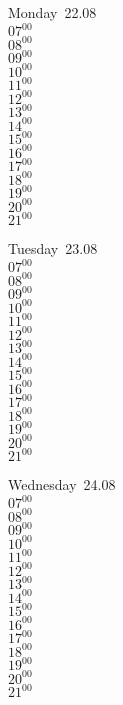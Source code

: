 \documentclass[11pt,a4paper]{book}\usepackage[]{graphicx}\usepackage[]{color}
\begin{document}
\begin{headerbox}
\end{headerbox}
\begin{weekdaybox}
  Monday~22.08\\
  { 
  \vfill
  $07^{00}$\\
$08^{00}$\\
$09^{00}$\\
$10^{00}$\\
$11^{00}$\\
$12^{00}$\\
$13^{00}$\\
$14^{00}$\\
$15^{00}$\\
$16^{00}$\\
$17^{00}$\\
$18^{00}$\\
$19^{00}$\\
$20^{00}$\\
$21^{00}$\\
  }
\end{weekdaybox}
\begin{weekdaybox}
  Tuesday~23.08\\
  { 
  \vfill
  $07^{00}$\\
$08^{00}$\\
$09^{00}$\\
$10^{00}$\\
$11^{00}$\\
$12^{00}$\\
$13^{00}$\\
$14^{00}$\\
$15^{00}$\\
$16^{00}$\\
$17^{00}$\\
$18^{00}$\\
$19^{00}$\\
$20^{00}$\\
$21^{00}$\\
  }
\end{weekdaybox}
\begin{weekdaybox}
  Wednesday~24.08\\
  { 
  \vfill
  $07^{00}$\\
$08^{00}$\\
$09^{00}$\\
$10^{00}$\\
$11^{00}$\\
$12^{00}$\\
$13^{00}$\\
$14^{00}$\\
$15^{00}$\\
$16^{00}$\\
$17^{00}$\\
$18^{00}$\\
$19^{00}$\\
$20^{00}$\\
$21^{00}$\\
  }
\end{weekdaybox}
\end{document}

